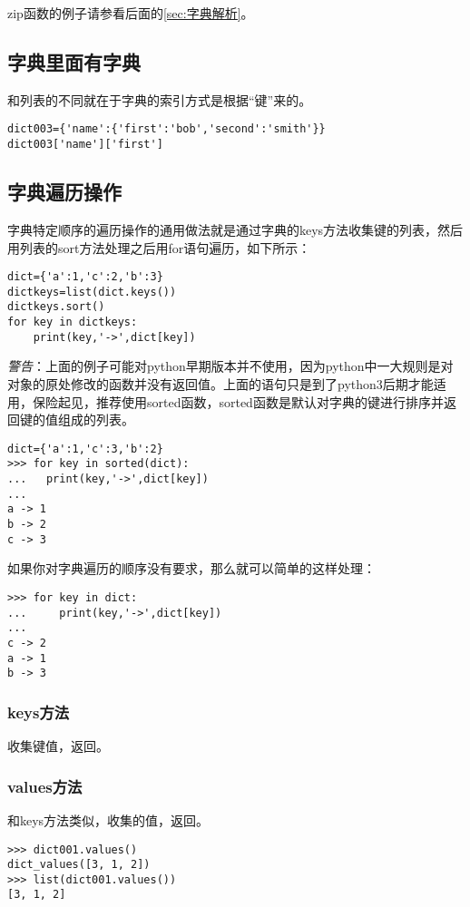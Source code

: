 \documentclass[12pt,oneside]{book}
\begin{document}
\begin{common-format}
zip函数的例子请参看后面的\ref{sec:字典解析}。



\subsection{字典里面有字典}
和列表的不同就在于字典的索引方式是根据“键”来的。
\begin{Verbatim}
dict003={'name':{'first':'bob','second':'smith'}}
dict003['name']['first']
\end{Verbatim}

\subsection{字典遍历操作}
字典特定顺序的遍历操作的通用做法就是通过字典的keys方法收集键的列表，然后用列表的sort方法处理之后用for语句遍历，如下所示：
\begin{Verbatim}
dict={'a':1,'c':2,'b':3}
dictkeys=list(dict.keys())
dictkeys.sort()
for key in dictkeys:
    print(key,'->',dict[key])
\end{Verbatim}

\emph{警告}：上面的例子可能对python早期版本并不使用，因为python中一大规则是对对象的原处修改的函数并没有返回值。上面的语句只是到了python3后期才能适用，保险起见，推荐使用sorted函数，sorted函数是默认对字典的键进行排序并返回键的值组成的列表。
\begin{Verbatim}
dict={'a':1,'c':3,'b':2}
>>> for key in sorted(dict):
...   print(key,'->',dict[key])
... 
a -> 1
b -> 2
c -> 3
\end{Verbatim}


如果你对字典遍历的顺序没有要求，那么就可以简单的这样处理：
\begin{Verbatim}
>>> for key in dict:
...     print(key,'->',dict[key])
... 
c -> 2
a -> 1
b -> 3
\end{Verbatim}


\subsubsection{keys方法}
收集键值，返回。

\subsubsection{values方法}
和keys方法类似，收集的值，返回。
\begin{Verbatim}
>>> dict001.values()
dict_values([3, 1, 2])
>>> list(dict001.values())
[3, 1, 2]
\end{Verbatim}


\end{common-format}
\end{document}
